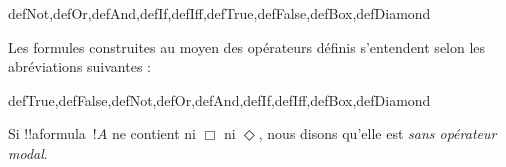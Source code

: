 \documentclass[../../../include/open-logic-section]{subfiles}
\begin{document}
\begin{tagblock}{defNot,defOr,defAnd,defIf,defIff,defTrue,defFalse,defBox,defDiamond}
\begin{defn}
Les formules construites au moyen des opérateurs définis s'entendent
selon les abréviations suivantes :

\begin{tagenumerate}{defTrue,defFalse,defNot,defOr,defAnd,defIf,defIff,defBox,defDiamond}









\end{tagenumerate}
\end{defn}
\end{tagblock}

Si !!a{formula}~$!A$ ne contient ni $\Box$ ni $\Diamond$, nous
disons qu'elle est \emph{sans opérateur modal}.
\end{document}
